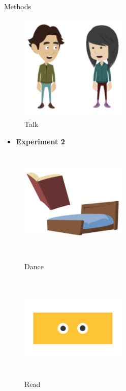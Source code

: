 \documentclass[final]{beamer}
\newlength{\colwidth}
\begin{document}
\begin{frame}[t]
\begin{columns}[t]
\begin{column}{\colwidth}
\begin{block}{Methods}
\begin{figure}
\begin{minipage}[t]{0.2\linewidth}
        \centering
        \includegraphics[width=2in, height=2in]{figures/talk.png}
        \caption{Talk}
      \end{minipage}
    \end{figure}    

    \begin{itemize}
      \item \textbf{Experiment 2}
    \end{itemize}
    \begin{figure}
      \begin{minipage}[t]{0.2\linewidth}
        \centering
        \includegraphics[width=2in, height=2in]{figures/fraw.png}
        \caption{Dance}
      \end{minipage}
      \begin{minipage}[t]{0.2\linewidth}
        \centering
        \includegraphics[width=2in, height=2in]{figures/gobb.png}
        \caption{Read}
      \end{minipage}%
      \begin{minipage}[t]{0.2\linewidth}

\end{minipage}
\end{figure}
\end{block}
\end{column}
\end{columns}
\end{frame}
\end{document}
